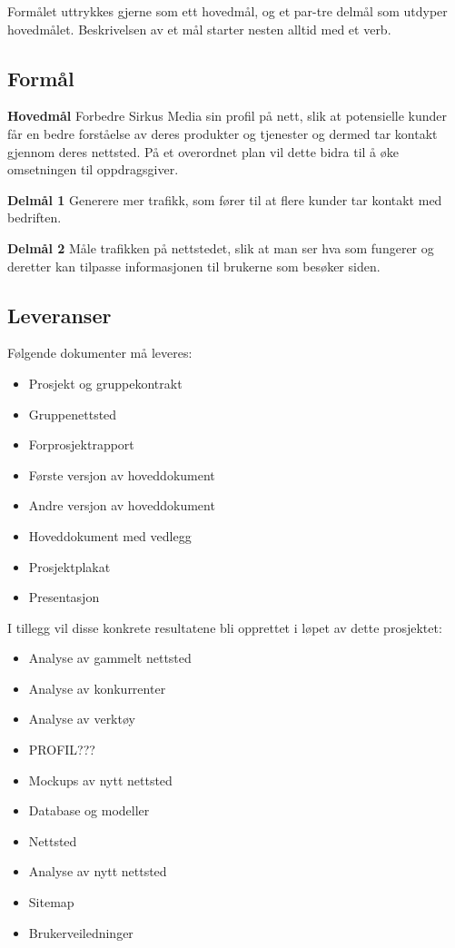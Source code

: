\documentclass[11pt,a4paper]{report}
\begin{document}
Formålet uttrykkes gjerne som ett hovedmål, og et par-tre delmål som utdyper hovedmålet. Beskrivelsen av et mål starter nesten alltid med et verb.


\subsection*{Formål}

\begin{compactitem}
\item [{\bf Hovedmål}] Forbedre Sirkus Media sin profil på nett, slik at potensielle kunder får en bedre forståelse av deres produkter og tjenester og dermed tar kontakt gjennom deres nettsted. På et overordnet plan vil dette bidra til å øke omsetningen til oppdragsgiver.
\begin{compactitem}
\item [{\bf  Delmål 1} ] Generere mer trafikk, som fører til at flere kunder tar kontakt med bedriften. 
\item [{\bf  Delmål 2} ] Måle trafikken på nettstedet, slik at man ser hva som fungerer og deretter kan tilpasse informasjonen til brukerne som besøker siden.
\end{compactitem}
\end{compactitem}

\subsection*{Leveranser}

Følgende dokumenter må leveres:
\begin{itemize}
\item Prosjekt og gruppekontrakt
\item Gruppenettsted
\item Forprosjektrapport
\item Første versjon av hoveddokument
\item Andre versjon av hoveddokument
\item Hoveddokument med vedlegg
\item Prosjektplakat
\item Presentasjon
\end{itemize}

I tillegg vil disse konkrete resultatene bli opprettet i løpet av dette prosjektet:

\begin{itemize}
\item Analyse av gammelt nettsted
\item Analyse av konkurrenter
\item Analyse av verktøy
\item PROFIL???
\item Mockups av nytt nettsted
\item Database og modeller
\item Nettsted
\item Analyse av nytt nettsted
\item Sitemap
\item Brukerveiledninger
\end{itemize}
\end{document}
